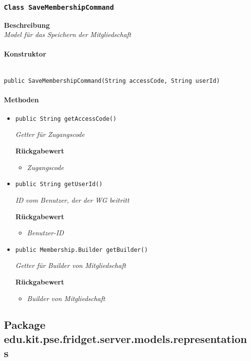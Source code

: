      \subsubsection{\texttt{Class SaveMembershipCommand}}
     \textbf{Beschreibung} \\
     \textit{Model für das Speichern der Mitgliedschaft}
     \paragraph*{Konstruktor}\mbox{} \\
     \texttt{public SaveMembershipCommand(String accessCode, String userId)}
     \paragraph*{Methoden}
     \begin{itemize}
     	\item{\texttt{public String getAccessCode()}}
     	
     	\textit{Getter für Zugangscode}
     	
     	\textbf{Rückgabewert}
     	\begin{itemize}
     		\item\textit{Zugangscode}
     	\end{itemize}
     
     \item{\texttt{public String getUserId()}}
     	
     	\textit{ID vom Benutzer, der der WG beitritt}
     	
     	\textbf{Rückgabewert}
     	\begin{itemize}
     		\item\textit{Benutzer-ID}
     	\end{itemize}
     
     \item{\texttt{public Membership.Builder getBuilder()}}
     	
     	\textit{Getter für Builder von Mitgliedschaft}
     	
     	\textbf{Rückgabewert}
     	\begin{itemize}
     		\item\textit{Builder von Mitgliedschaft}
     	\end{itemize}
     \end{itemize}
 
     \subsection{Package edu.kit.pse.fridget.server.models.representations}
